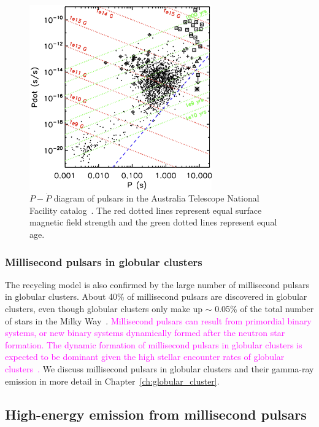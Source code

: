 \documentclass[doublespace,nopageskip]{VTthesis} %
\newcommand{\DS}[1]{\textcolor{magenta}{#1}}
\begin{document}
\begin{figure}[htb]
    \centering
    \includegraphics[width=0.7\textwidth]{Figures/Intro/PP.png}
    \caption{$P-\dot{P}$ diagram of pulsars in the Australia Telescope National Facility catalog~\cite{2011AIPC.1357..269T,2005AJ....129.1993M}. The red dotted lines represent equal surface magnetic field strength and the green dotted lines represent equal age.}
    \label{fig:pp}
\end{figure}

\subsubsection{Millisecond pulsars in globular clusters}

The recycling model is also confirmed by the large number of millisecond pulsars in globular clusters. About 40\% of millisecond pulsars are discovered in globular clusters, even though globular clusters only make up $\sim$ 0.05\% of the total number of stars in the Milky Way~\cite{2019ApJ...877..122Y}. 
\DS{Millisecond pulsars can result from primordial binary systems, or new binary systems dynamically formed after the neutron star formation. The dynamic formation of millisecond pulsars in globular clusters is expected to be dominant given the high stellar encounter rates of globular clusters~\cite{2013ApJ...766..136B}.}
We discuss millisecond pulsars in globular clusters and their gamma-ray emission in more detail in Chapter~\ref{ch:globular_cluster}.

\subsection{High-energy emission from millisecond pulsars}
\end{document}
